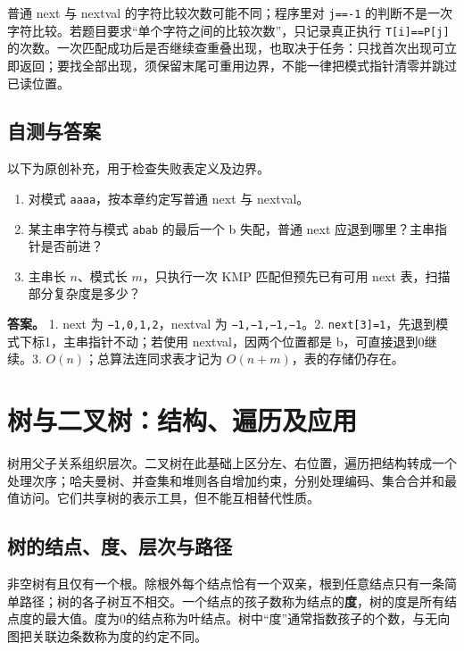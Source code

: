 普通 next 与 nextval 的字符比较次数可能不同；程序里对 \allowbreak{}\texttt{j==-1} 的判断不是一次字符比较。若题目要求``单个字符之间的比较次数''，只记录真正执行 \allowbreak{}\texttt{T{[}i{]}==P{[}j{]}} 的次数。一次匹配成功后是否继续查重叠出现，也取决于任务：只找首次出现可立即返回；要找全部出现，须保留末尾可重用边界，不能一律把模式指针清零并跳过已读位置。

\section{自测与答案}\label{ds-ch4-check}

以下为原创补充，用于检查失败表定义及边界。

\begin{enumerate}
\def\labelenumi{\arabic{enumi}.}
\tightlist
\item
  对模式 \allowbreak{}\texttt{aaaa}，按本章约定写普通 next 与 nextval。
\item
  某主串字符与模式 \allowbreak{}\texttt{abab} 的最后一个 b 失配，普通 next 应退到哪里？主串指针是否前进？
\item
  主串长 \(n\)、模式长 \(m\)，只执行一次 KMP 匹配但预先已有可用 next 表，扫描部分复杂度是多少？
\end{enumerate}

\textbf{答案。} 1. next 为 \allowbreak{}\texttt{−1,}\allowbreak{}\texttt{0,}\allowbreak{}\texttt{1,}\allowbreak{}\texttt{2}，nextval 为 \allowbreak{}\texttt{−1,}\allowbreak{}\texttt{−1,}\allowbreak{}\texttt{−1,}\allowbreak{}\texttt{−1}。2. \allowbreak{}\texttt{next{[}3{]}=1}，先退到模式下标1，主串指针不动；若使用 nextval，因两个位置都是 b，可直接退到0继续。3. \(O(n)\)；总算法连同求表才记为 \(O(n+m)\)，表的存储仍存在。

\chapter{树与二叉树：结构、遍历及应用}\label{ds-ch5}

树用父子关系组织层次。二叉树在此基础上区分左、右位置，遍历把结构转成一个处理次序；哈夫曼树、并查集和堆则各自增加约束，分别处理编码、集合合并和最值访问。它们共享树的表示工具，但不能互相替代性质。

\section{树的结点、度、层次与路径}\label{ds-05-01}

非空树有且仅有一个根。除根外每个结点恰有一个双亲，根到任意结点只有一条简单路径；树的各子树互不相交。一个结点的孩子数称为结点的\textbf{度}，树的度是所有结点度的最大值。度为0的结点称为叶结点。树中``度''通常指数孩子的个数，与无向图把关联边条数称为度的约定不同。

